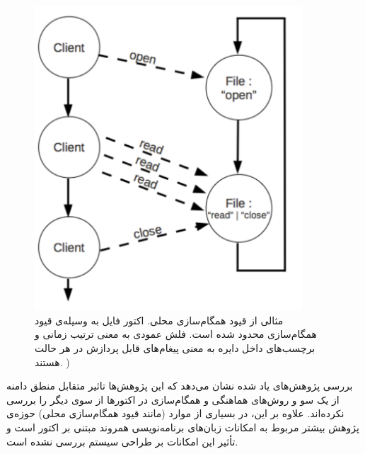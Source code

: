 \begin{figure}
    \begin{center}
	\includegraphics[width=10cm]{3-RelatedWork/Figures/LSC.pdf}
    \end{center}
    \caption{\label{fig:lsc} مثالی از قیود همگام‌سازی محلی. اکتور فایل به وسیله‌ی قیود همگام‌سازی محدود شده است. فلش عمودی به معنی ترتیب زمانی و برچسب‌های داخل دایره به معنی پیغام‌های قابل پردازش در هر حالت هستند. ) }
\end{figure}
 بررسی پژوهش‌های یاد شده نشان می‌دهد که این پژوهش‌ها تاثیر متقابل منطق دامنه از یک سو و روش‌های هماهنگی و همگام‌سازی در اکتورها از سوی دیگر را بررسی نکرده‌اند. علاوه بر این، در بسیاری از موارد (مانند قیود همگام‌سازی محلی) حوزه‌ی پژوهش بیشتر مربوط به امکانات زبان‌های برنامه‌نویسی همروند مبتنی بر اکتور است و تأثیر این امکانات بر طراحی سیستم بررسی نشده است.
